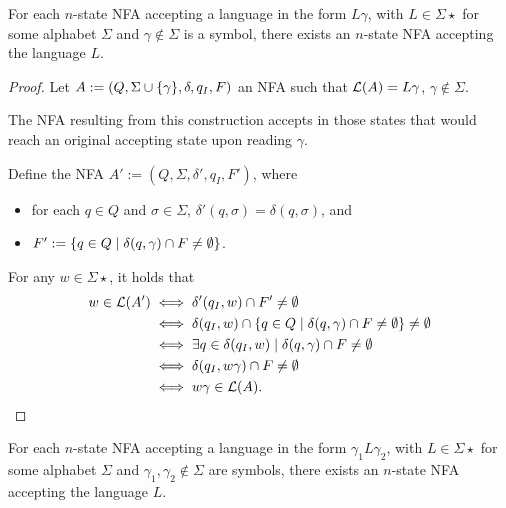 \begin{thrm}
	For each $n$-state NFA accepting a language in the form $L\gamma$, with $L\in\Sigma\star$ for some alphabet $\Sigma$ and $\gamma\notin\Sigma$ is a symbol, there exists an $n$-state NFA accepting the language $L$.
\end{thrm}
\begin{proof}
	Let $A:=(Q,\Sigma\cup\{\gamma\},\delta,q_I,F)$ an NFA such that $\mathcal L(A)=L\gamma$, $\gamma\notin\Sigma$.

	The NFA resulting from this construction accepts in those states that would reach an original accepting state upon reading $\gamma$.

	Define the NFA $A':=(Q,\Sigma,\delta',q_I,F')$, where
	\begin{itemize}
		\item for each $q\in Q$ and $\sigma\in\Sigma$, $\delta'(q,\sigma)=\delta(q,\sigma)$, and
		\item $F':=\{q\in Q\mid \delta(q,\gamma)\cap F\ne\emptyset\}$.
	\end{itemize}

	For any $w\in\Sigma\star$, it holds that
	\begin{align*}
		w\in\mathcal L(A') & \iff \delta'(q_I,w)\cap F'\ne\emptyset                                                 \\
		                 & \iff \delta(q_I,w)\cap \{q\in Q\mid \delta(q,\gamma)\cap F\ne\emptyset\}\ne\emptyset \\
		                 & \iff \exists q\in\delta(q_I,w)\mid \delta(q,\gamma)\cap F\ne\emptyset                  \\
		                 & \iff \delta(q_I,w\gamma)\cap F\ne\emptyset                                             \\
		                 & \iff w\gamma\in\mathcal L(A) \text. \qedhere
	\end{align*}
\end{proof}


\begin{corol}
	For each $n$-state NFA accepting a language in the form $\gamma_1 L\gamma_2$, with $L\in\Sigma\star$ for some alphabet $\Sigma$ and $\gamma_1,\gamma_2\notin\Sigma$ are symbols, there exists an $n$-state NFA accepting the language $L$.
\end{corol}

